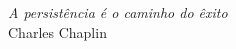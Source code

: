 \chapter*{}
\vspace{15cm}
\begin{flushright}
	\textit
	{
		A persistência é o caminho do êxito
	}\medskip\\ 
	Charles Chaplin
\end{flushright}